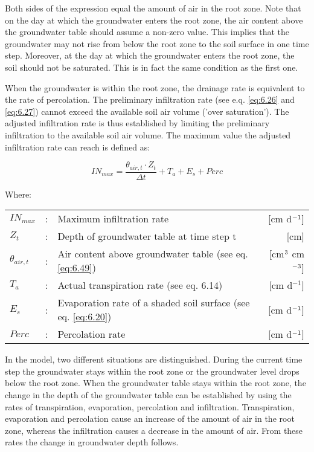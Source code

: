 Both sides of the expression equal the amount of air in the root zone. Note that on the
day at which the groundwater enters the root zone, the air content above the groundwater
table should assume a non-zero value. This implies that the groundwater may not rise
from below the root zone to the soil surface in one time step. Moreover, at the day at
which the groundwater enters the root zone, the soil should not be saturated. This is in
fact the same condition as the first one. 

When the groundwater is within the root zone, the drainage rate is equivalent to the rate
of percolation. The preliminary infiltration rate (see e.q. \ref{eq:6.26} and \ref{eq:6.27}) 
cannot exceed
the available soil air volume ('over saturation'). The adjusted infiltration rate is thus
established by limiting the preliminary infiltration to the available soil air volume. The
maximum value the adjusted infiltration rate can reach is defined as:

\begin{equation}
\label{eq:6.50}
IN_{max} = {\frac{\theta_{air,t} \cdot Z _{t}}{\Delta t}} + T_{a} + E_{s} + Perc
\end{equation}

Where:\\[5pt]
\begin{tabularx}{\textwidth}{llXr}
$IN_{max}$ &:& Maximum infiltration rate  & [cm d$^{{\rm -1}}$]\\
$Z_{t}$ &:& Depth of groundwater table at time step t  & [cm]\\
$\theta_{air,t}$ &:& Air content above groundwater table (see eq. \ref{eq:6.49})  
    & [cm$^{{\rm 3}}$ cm$^{{\rm -3}}$]\\
$T_{a}$ &:& Actual transpiration rate (see eq. 6.14)  & [cm d$^{-1}$]\\
$E_{s}$ &:& Evaporation rate of a shaded soil surface (see eq. \ref{eq:6.20})  
    & [cm d$^{{\rm -1}}$]\\
$Perc$ &:& Percolation rate  & [cm d$^{{\rm -1}}$]\\
\end{tabularx}

In the model, two different situations are distinguished. During the current time step the
groundwater stays within the root zone or the groundwater level drops below the root
zone. When the groundwater table stays within the root zone, the change in the depth of
the groundwater table can be established by using the rates of transpiration, evaporation,
percolation and infiltration. Transpiration, evaporation and percolation cause an increase
of the amount of air in the root zone, whereas the infiltration causes a decrease in the
amount of air. From these rates the change in groundwater depth follows. 

